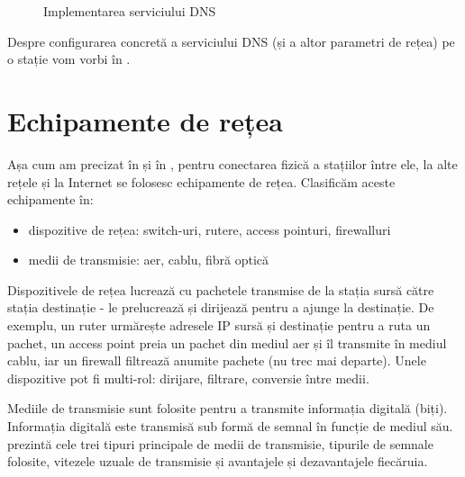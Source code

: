 \begin{figure}[htbp]
  \centering
  \def\svgwidth{\columnwidth}
  
  \caption{Implementarea serviciului DNS}
  \label{fig:net:dns-service}
\end{figure}

Despre configurarea concretă a serviciului DNS (și a altor parametri de rețea) pe o stație vom vorbi în .

\section{Echipamente de rețea}
\label{sec:net:equipment}

Așa cum am precizat în  și în , pentru conectarea fizică a stațiilor între ele, la alte rețele și la Internet se folosesc echipamente de rețea.
Clasificăm aceste echipamente în:

\begin{itemize}
  \item dispozitive de rețea: switch-uri, rutere, access pointuri, firewalluri
  \item medii de transmisie: aer, cablu, fibră optică
\end{itemize}

Dispozitivele de rețea lucrează cu pachetele transmise de la stația sursă către stația destinație - le prelucrează și dirijează pentru a ajunge la destinație.
De exemplu, un ruter urmărește adresele IP sursă și destinație pentru a ruta un pachet, un access point preia un pachet din mediul aer și îl transmite în mediul cablu, iar un firewall filtrează anumite pachete (nu trec mai departe).
Unele dispozitive pot fi multi-rol: dirijare, filtrare, conversie între medii.

Mediile de transmisie sunt folosite pentru a transmite informația digitală (biți).
Informația digitală este transmisă sub formă de semnal în funcție de mediul său.
 prezintă cele trei tipuri principale de medii de transmisie, tipurile de semnale folosite, vitezele uzuale de transmisie și avantajele și dezavantajele fiecăruia.

